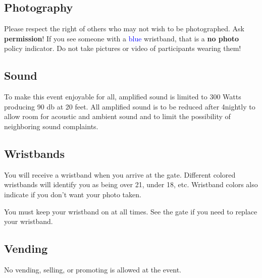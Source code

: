 \begin{multicols}{2}



\columnbreak
\subsection*{Photography}
Please respect the right of others who may not wish to be photographed. Ask \textbf{permission}! If you see someone with a \textcolor{blue}{blue} wristband, that is a \textbf{no photo} policy indicator. 
Do not take pictures or video of participants wearing them! 


\subsection*{Sound}
To make this event enjoyable for all, amplified sound is limited to 300 Watts producing 90 db at 20 feet. All amplified sound is to be reduced after 4\am nightly to allow room for acoustic and ambient sound and to limit the possibility of neighboring sound complaints. 

\subsection*{Wristbands}
\label{sub:wristbands}
You will receive a wristband when you arrive at the \gls{gate}.  Different colored wristbands will identify you as being over 21, under 18, etc.  Wristband colors also indicate if you don't want your photo taken.  

You must keep your wristband on at all times.  See the \gls{gate} if you need to replace your wristband.

\subsection*{Vending}
No vending, selling, or promoting is allowed at the event.
\end{multicols}

